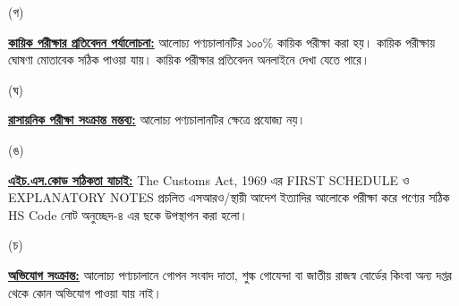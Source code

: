 \documentclass[12pt]{article}
\begin{document}
\begin{minipage}[t]{0.05\linewidth}
\hspace{1em}
\end{minipage}
\begin{minipage}[t]{0.05\linewidth}
(গ)
\end{minipage}
\begin{minipage}[t]{0.90\linewidth}
\underline{\textbf{কায়িক পরীক্ষার প্রতিবেদন পর্যালোচনা:}}
আলোচ্য পণ্যচালানটির ১০০\% কায়িক পরীক্ষা করা হয়।
কায়িক পরীক্ষায় ঘোষণা মোতাবেক সঠিক পাওয়া যায়।
কায়িক পরীক্ষার প্রতিবেদন অনলাইনে দেখা যেতে পারে।
\\
\end{minipage}
\begin{minipage}[t]{0.05\linewidth}
\hspace{1em}
\end{minipage}
\begin{minipage}[t]{0.05\linewidth}
(ঘ)
\end{minipage}
\begin{minipage}[t]{0.90\linewidth}
\underline{\textbf{রাসায়নিক পরীক্ষা সংক্রান্ত মন্তব্য:}}
আলোচ্য পণ্যচালানটির ক্ষেত্রে প্রযোজ্য নয়।
\\
\end{minipage}
\begin{minipage}[t]{0.05\linewidth}
\hspace{1em}
\end{minipage}
\begin{minipage}[t]{0.05\linewidth}
(ঙ)
\end{minipage}
\begin{minipage}[t]{0.90\linewidth}
\underline{\textbf{এইচ.এস.কোড সঠিকতা যাচাই:}}
The Customs Act, 1969 এর FIRST SCHEDULE ও
EXPLANATORY NOTES প্রচলিত এসআরও/স্থায়ী আদেশ ইত্যাদির আলোকে পরীক্ষা করে পণ্যের সঠিক HS Code নোট অনুচ্ছেদ-৪
এর ছকে উপস্থাপন করা হলো।
\\
\end{minipage}
\begin{minipage}[t]{0.05\linewidth}
\hspace{1em}
\end{minipage}
\begin{minipage}[t]{0.05\linewidth}
(চ)
\end{minipage}
\begin{minipage}[t]{0.90\linewidth}
\underline{\textbf{অভিযোগ সংক্রান্ত:}} আলোচ্য পণ্যচালানে
গোপন সংবাদ দাতা, শুল্ক গোযেন্দা বা
জাতীয় রাজস্ব বোর্ডের কিংবা অন্য দপ্তর থেকে
কোন অভিযোগ পাওয়া যায় নাই।
\\
\end{minipage}
\end{document}
